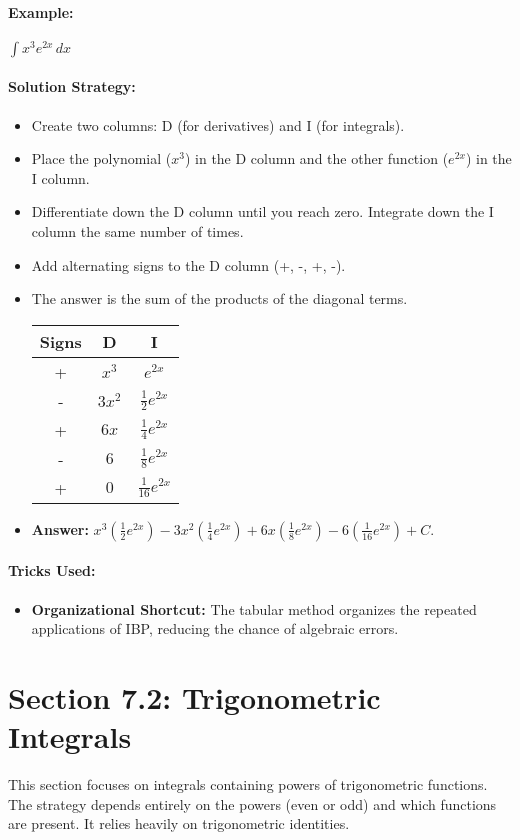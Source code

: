 \documentclass{article}
\begin{document}
\paragraph{Example:} $ \int x^3 e^{2x} \,dx $
\paragraph{Solution Strategy:}
\begin{itemize}
    \item Create two columns: D (for derivatives) and I (for integrals).
    \item Place the polynomial ($x^3$) in the D column and the other function ($e^{2x}$) in the I column.
    \item Differentiate down the D column until you reach zero. Integrate down the I column the same number of times.
    \item Add alternating signs to the D column (+, -, +, -).
    \item The answer is the sum of the products of the diagonal terms.
    \begin{center}
    \begin{tabular}{| c | c | c |}
    \hline
    \textbf{Signs} & \textbf{D} & \textbf{I} \\ \hline
    + & $x^3$ & $e^{2x}$ \\
    - & $3x^2$ & $\frac{1}{2}e^{2x}$ \\
    + & $6x$ & $\frac{1}{4}e^{2x}$ \\
    - & $6$ & $\frac{1}{8}e^{2x}$ \\
    + & $0$ & $\frac{1}{16}e^{2x}$ \\ \hline
    \end{tabular}
    \end{center}
    \item \textbf{Answer:} $x^3(\frac{1}{2}e^{2x}) - 3x^2(\frac{1}{4}e^{2x}) + 6x(\frac{1}{8}e^{2x}) - 6(\frac{1}{16}e^{2x}) + C$.
\end{itemize}
\paragraph{Tricks Used:}
\begin{itemize}
    \item \textbf{Organizational Shortcut:} The tabular method organizes the repeated applications of IBP, reducing the chance of algebraic errors.
\end{itemize}

\section{Section 7.2: Trigonometric Integrals}
This section focuses on integrals containing powers of trigonometric functions. The strategy depends entirely on the powers (even or odd) and which functions are present. It relies heavily on trigonometric identities.
\end{document}
